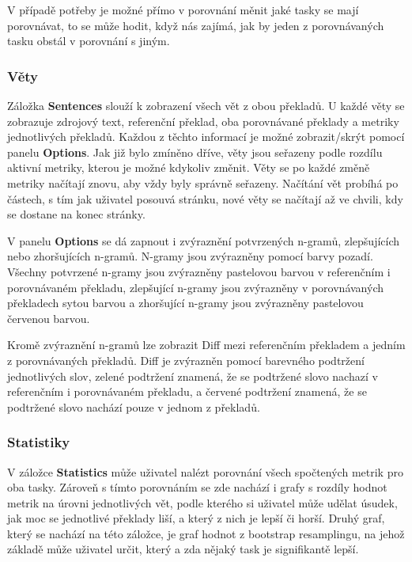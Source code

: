 V případě potřeby je možné přímo v porovnání měnit jaké tasky se mají porovnávat,
  to se může hodit,
  když nás zajímá,
  jak by jeden z porovnávaných tasku obstál v porovnání s jiným.

\subsubsection{Věty}
Záložka \textbf{Sentences} slouží k zobrazení všech vět z obou překladů.
U každé věty se zobrazuje zdrojový text,
  referenční překlad, oba porovnávané překlady
  a metriky jednotlivých překladů.
Každou z těchto informací je možné zobrazit/skrýt pomocí panelu \textbf{Options}.
Jak již bylo zmíněno dříve,
  věty jsou seřazeny podle rozdílu aktivní metriky,
  kterou je možné kdykoliv změnit.
Věty se po každé změně metriky načítají znovu,
  aby vždy byly správně seřazeny.
Načítání vět probíhá po částech,
  s tím jak uživatel posouvá stránku,
  nové věty se načítají až ve chvili,
  kdy se dostane na konec stránky.

V panelu \textbf{Options} se dá zapnout i zvýraznění potvrzených n-gramů, zlepšujících nebo zhoršujících n-gramů.
N-gramy jsou zvýrazněny pomocí barvy pozadí.
Všechny potvrzené n-gramy jsou zvýrazněny pastelovou barvou v referenčním i porovnávaném překladu,
  zlepšující n-gramy jsou zvýrazněny v porovnávaných překladech sytou barvou
  a zhoršující n-gramy jsou zvýrazněny pastelovou červenou barvou.

Kromě zvýraznění n-gramů lze zobrazit Diff mezi referenčním překladem a jedním z porovnávaných překladů.
Diff je zvýrazněn pomocí barevného podtržení jednotlivých slov,
  zelené podtržení znamená, že se podtržené slovo nachazí v referenčním i porovnávaném překladu,
  a červené podtržení znamená, že se podtržené slovo nachází pouze v jednom z překladů.

\subsubsection{Statistiky}
V záložce \textbf{Statistics} může uživatel nalézt porovnání všech spočtených metrik pro oba tasky.
Zároveň s tímto porovnáním se zde nachází i grafy s rozdíly hodnot metrik na úrovni jednotlivých vět,
  podle kterého si uživatel může udělat úsudek,
  jak moc se jednotlivé překlady liší,
  a který z nich je lepší či horší.
Druhý graf, který se nachází na této záložce,
  je graf hodnot z bootstrap resamplingu,
  na jehož základě může uživatel určit,
  který a zda nějaký task je signifikantě lepší.

